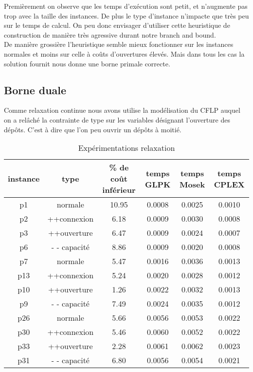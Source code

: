 \documentclass[12pt,a4paper]{article}
\begin{document}
Premièrement on observe que les temps d’exécution sont petit, et n'augmente pas trop avec la taille des instances. De plus le type d'instance n'impacte que très peu sur le temps de calcul. On peu donc envisager d'utiliser cette heuristique de construction de manière très agressive durant notre branch and bound.\\

De manière grossière l'heuristique semble mieux fonctionner sur les instances normales et moins sur celle à coûts d'ouvertures élevés. Mais dans tous les cas la solution fournit nous donne une borne primale correcte. 

\subsection{Borne duale}

Comme relaxation continue nous avons utilise la modélisation du CFLP auquel on a relâché la contrainte de type sur les variables désignant l’ouverture des dépôts. C'est à dire que l'on peu ouvrir un dépôts à moitié.\\

\begin{table}[!h]
\centering
\begin{tabular}{|c|c|c|c|c|c|}
  \hline
  instance & type & \% de coût inférieur & temps GLPK & temps Mosek & temps CPLEX \\
  \hline
	p1 & normale & 10.95 & 0.0008 & 0.0025 & 0.0010 \\
	p2 & ++connexion & 6.18 & 0.0009 & 0.0030 & 0.0008 \\
	p3 & ++ouverture & 6.47 & 0.0009 & 0.0024 & 0.0007 \\
	p6 & - - capacité & 8.86 & 0.0009 & 0.0020 & 0.0008 \\
  \hline
	p7 & normale & 5.47 & 0.0016 & 0.0036 & 0.0013 \\
	p13 & ++connexion & 5.24 & 0.0020 & 0.0028 & 0.0012 \\
	p10 & ++ouverture & 1.26 & 0.0022 & 0.0032 & 0.0013 \\
	p9 & - - capacité & 7.49 & 0.0024 & 0.0035 & 0.0012 \\
  \hline	
	p26 & normale & 5.66 & 0.0056 & 0.0053 & 0.0022 \\
	p30 & ++connexion & 5.46 & 0.0060 & 0.0052 & 0.0022 \\
	p33 & ++ouverture & 2.28 & 0.0061 & 0.0062 & 0.0023 \\
	p31 & - - capacité & 6.80 & 0.0056 & 0.0054 & 0.0021 \\
  \hline
\end{tabular}
\caption{Expérimentations relaxation}
\label{relax}
\end{table}
\end{document}
